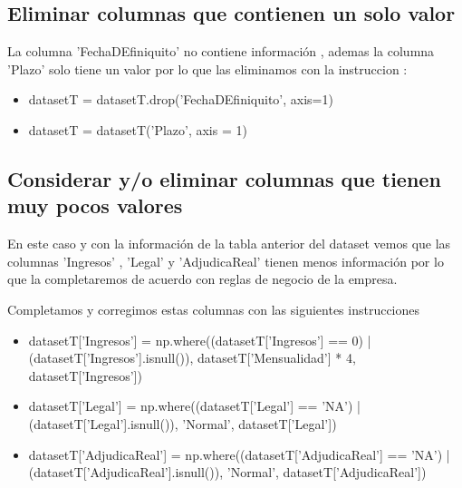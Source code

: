 \subsection{Eliminar columnas que contienen un solo valor} 

    La columna 'FechaDEfiniquito' no contiene información , ademas la columna 'Plazo' 
    solo tiene un valor por lo que las eliminamos con la 
    instruccion :
    \begin{tcolorbox}[colback=gray!20, colframe=gray!80, width=\textwidth]
        \begin{itemize}
            \item datasetT = datasetT.drop('FechaDEfiniquito', axis=1)
            \item datasetT = datasetT('Plazo', axis = 1)
        \end{itemize}
\end{tcolorbox}

\subsection{ Considerar y/o eliminar columnas que tienen muy pocos valores}

En este caso y con la información de la tabla anterior del dataset vemos que las columnas
'Ingresos' , 'Legal' y 'AdjudicaReal' tienen menos información por lo que la completaremos de
acuerdo con reglas de negocio de la empresa. \medskip

Completamos y corregimos estas columnas con las siguientes instrucciones \medskip

\begin{tcolorbox}[colback=gray!20, colframe=gray!80, width=\textwidth]
\begin{itemize}

\item datasetT['Ingresos'] = np.where((datasetT['Ingresos'] == 0) | (datasetT['Ingresos'].isnull()), datasetT['Mensualidad'] * 4, datasetT['Ingresos'])


\item datasetT['Legal'] = np.where((datasetT['Legal'] == 'NA') | (datasetT['Legal'].isnull()), 'Normal', datasetT['Legal'])


\item datasetT['AdjudicaReal'] = np.where((datasetT['AdjudicaReal'] == 'NA') | (datasetT['AdjudicaReal'].isnull()), 'Normal', datasetT['AdjudicaReal'])
\end{itemize}
\end{tcolorbox}


